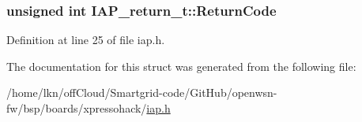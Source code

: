 \subsubsection[{\texorpdfstring{Return\+Code}{ReturnCode}}]{\setlength{\rightskip}{0pt plus 5cm}unsigned int I\+A\+P\+\_\+return\+\_\+t\+::\+Return\+Code}\hypertarget{struct_i_a_p__return__t_ac0a0c8d9daad36f4fc51fa53a8f25874}{}\label{struct_i_a_p__return__t_ac0a0c8d9daad36f4fc51fa53a8f25874}


Definition at line 25 of file iap.\+h.



The documentation for this struct was generated from the following file\+:\begin{DoxyCompactItemize}
\item 
/home/lkn/off\+Cloud/\+Smartgrid-\/code/\+Git\+Hub/openwsn-\/fw/bsp/boards/xpressohack/\hyperlink{iap_8h}{iap.\+h}\end{DoxyCompactItemize}
